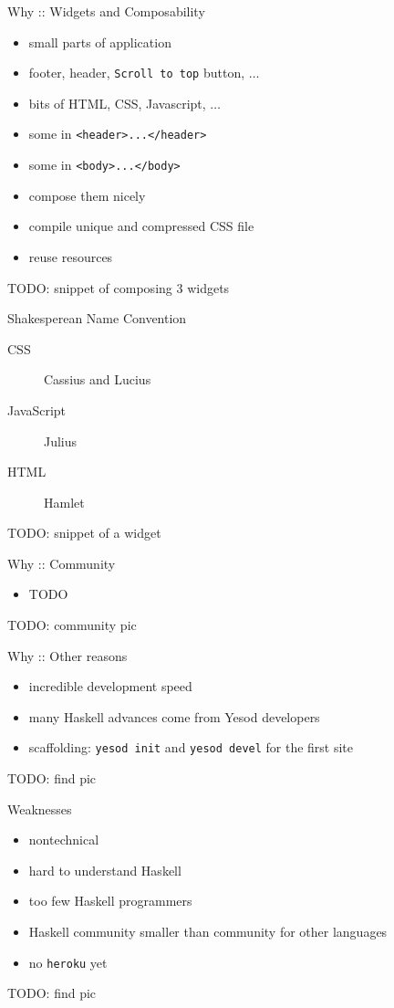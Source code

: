 \documentclass{beamer}
\begin{document}
\begin{frame}{Why :: Widgets and Composability}
  \begin{itemize}[<+->]
    \item small parts of application
    \item footer, header, \texttt{Scroll to top} button, $\ldots$
    \item bits of HTML, CSS, Javascript, $\ldots$
    \item some in \texttt{<header>...</header>}
    \item some in \texttt{<body>...</body>}
    \item compose them nicely
    \item compile unique and compressed CSS file
    \item reuse resources
  \end{itemize}
  TODO: snippet of composing 3 widgets
\end{frame}

\begin{frame}{Shakesperean Name Convention}
  \begin{description}
    \item[CSS] Cassius and Lucius
    \item[JavaScript] Julius
    \item[HTML] Hamlet
  \end{description}
  TODO: snippet of a widget
\end{frame}

\begin{frame}{Why :: Community}
  \begin{itemize}
    \item TODO
  \end{itemize}
  TODO: community pic
\end{frame}

\begin{frame}{Why :: Other reasons}
  \begin{itemize}
    \item incredible development speed
    \item many Haskell advances come from Yesod developers
    \item scaffolding: \texttt{yesod init} and \texttt{yesod devel} for the
    first site
  \end{itemize}
  TODO: find pic
\end{frame}

\begin{frame}{Weaknesses}
  \begin{itemize}
    \item nontechnical
    \pause
    \item hard to understand Haskell
    \item too few Haskell programmers
    \item Haskell community smaller than community for other languages
    \item no \texttt{heroku} yet
  \end{itemize}
  TODO: find pic
\end{frame}
\end{document}
